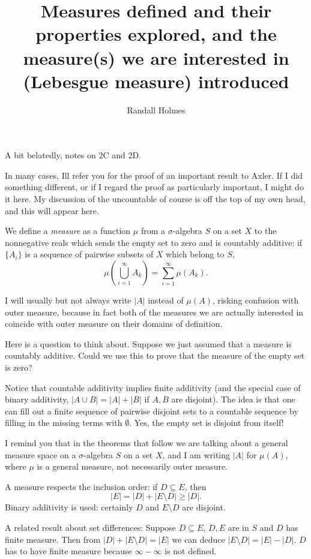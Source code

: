 \documentclass[12pt]{article}
\title{Measures defined and their properties explored, and the measure(s) we are interested in (Lebesgue measure) introduced}
\author{Randall Holmes}
\begin{document}
\maketitle

A bit belatedly, notes on 2C and 2D.

In many cases, Ill refer you for the proof of an important result to Axler.  If I did something different, or if I regard the proof as particularly important, I might do it here.
My discussion of the uncountable of course is off the top of my own head, and this will appear here.

We define a {\em measure\/} as a function $\mu$ from a $\sigma$-algebra $S$ on a set $X$ to the nonnegative reals which sends the empty set to zero and is countably additive:
if $\{A_i\}$ is a sequence of pairwise subsets of $X$ which belong to $S$, $$\mu(\bigcup_{i=1}^{\infty} A_k) = \sum_{i=1}^{\infty}\mu(A_k).$$

I will usually but not always write $|A|$ instead of $\mu(A)$, risking confusion with outer measure, because in fact both of the measures we are actually interested in coincide with outer measure on their domains of definition.

Here is a question to think about.  Suppose we just assumed that a measure is countably additive.  Could we use this to prove that the measure of the empty set is zero?

Notice that countable additivity implies finite additivity (and the special case of binary additivity, $|A \cup B| = |A| + |B|$ if $A,B$ are disjoint).  The idea is that one can fill out a finite sequence of pairwise disjoint sets to a countable sequence by filling in the missing terms with $\emptyset$.  Yes, the empty set is disjoint from itself!

I remind you that in the theorems that follow we are talking about a general measure space on a $\sigma$-algebra $S$ on a set $X$, and I am writing $|A|$ for $\mu(A)$, where $\mu$ is a general measure, not necessarily outer measure.

A measure respects the inclusion order:  if $D \subseteq E$, then $$|E| = |D| + |E \setminus D| \geq |D|.$$  Binary additivity is used:  certainly $D$ and $E \setminus D$ are disjoint.

A related result about set differences:  Suppose $D\subseteq E$, $D,E$ are in $S$ and $D$ has finite measure.  Then from $|D|+|E \setminus D| = |E|$ we can deduce
$|E \setminus D| = |E|-|D|$.  $D$ has to have finite measure because $\infty - \infty$ is not defined.
\end{document}
